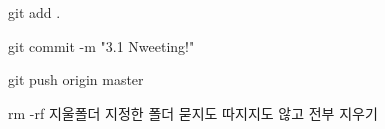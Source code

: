 git add .

git commit -m "3.1 Nweeting!"

git push origin master

rm -rf 지울폴더
지정한 폴더 묻지도 따지지도 않고 전부 지우기